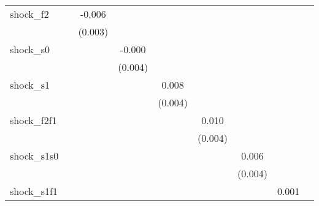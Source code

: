 {\begin{tabular}{l*{8}{c}}
\addlinespace
shock\_f2    &                     &      -0.006\sym{**} &                     &                     &                     &                     &                     &                     \\
            &                     &     (0.003)         &                     &                     &                     &                     &                     &                     \\
\addlinespace
shock\_s0    &                     &                     &      -0.000         &                     &                     &                     &                     &                     \\
            &                     &                     &     (0.004)         &                     &                     &                     &                     &                     \\
\addlinespace
shock\_s1    &                     &                     &                     &       0.008\sym{**} &                     &                     &                     &                     \\
            &                     &                     &                     &     (0.004)         &                     &                     &                     &                     \\
\addlinespace
shock\_f2f1  &                     &                     &                     &                     &       0.010\sym{**} &                     &                     &                     \\
            &                     &                     &                     &                     &     (0.004)         &                     &                     &                     \\
\addlinespace
shock\_s1s0  &                     &                     &                     &                     &                     &       0.006         &                     &                     \\
            &                     &                     &                     &                     &                     &     (0.004)         &                     &                     \\
\addlinespace
shock\_s1f1  &                     &                     &                     &                     &                     &                     &       0.001         &                     \\

\end{tabular}}
